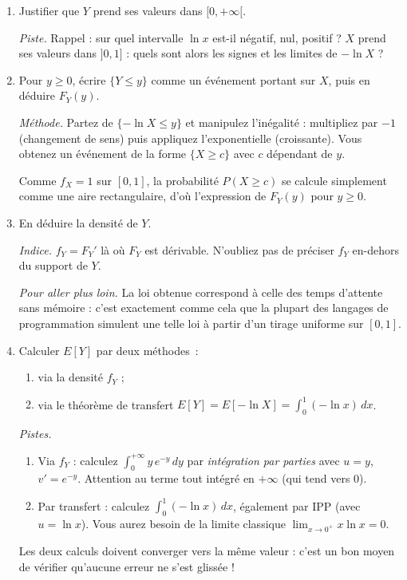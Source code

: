 \begin{enumerate}
  \item Justifier que $Y$ prend ses valeurs dans $[0,+\infty[$.
  \begin{solution}
    \textit{Piste.} Rappel : sur quel intervalle $\ln x$ est-il
    négatif, nul, positif ? $X$ prend ses valeurs dans $]0,1]$ :
    quels sont alors les signes et les limites de $-\ln X$ ?
  \end{solution}

  \item Pour $y\ge 0$, écrire $\{Y\le y\}$ comme un événement portant
  sur $X$, puis en déduire $F_Y(y)$.
  \begin{solution}
    \textit{Méthode.} Partez de $\{-\ln X\le y\}$ et manipulez
    l'inégalité : multipliez par $-1$ (changement de sens) puis
    appliquez l'exponentielle (croissante). Vous obtenez un
    événement de la forme $\{X\ge c\}$ avec $c$ dépendant de $y$.

    Comme $f_X=1$ sur $[0,1]$, la probabilité $P(X\ge c)$ se
    calcule simplement comme une aire rectangulaire, d'où
    l'expression de $F_Y(y)$ pour $y\ge 0$.
  \end{solution}

  \item En déduire la densité de $Y$.
  \begin{solution}
    \textit{Indice.} $f_Y=F_Y'$ là où $F_Y$ est dérivable.
    N'oubliez pas de préciser $f_Y$ en-dehors du support de $Y$.

    \textit{Pour aller plus loin.} La loi obtenue correspond à celle
    des \og temps d'attente sans mémoire \fg{} : c'est exactement
    comme cela que la plupart des langages de programmation
    simulent une telle loi à partir d'un tirage uniforme sur $[0,1]$.
  \end{solution}

  \item Calculer $E[Y]$ par deux méthodes~:
  \begin{enumerate}
    \item via la densité $f_Y$ ;
    \item via le théorème de transfert
    $E[Y]=E[-\ln X]=\int_0^1(-\ln x)\,dx$.
  \end{enumerate}
  \begin{solution}
    \textit{Pistes.}
    \begin{enumerate}
    \item Via $f_Y$ : calculez $\int_0^{+\infty}y\,e^{-y}\,dy$
    par \emph{intégration par parties} avec $u=y$, $v'=e^{-y}$.
    Attention au terme tout intégré en $+\infty$ (qui tend vers $0$).
    \item Par transfert : calculez $\int_0^1(-\ln x)\,dx$,
    également par IPP (avec $u=\ln x$). Vous aurez besoin de la
    limite classique $\lim_{x\to 0^+}x\ln x=0$.
    \end{enumerate}
    Les deux calculs doivent converger vers la même valeur : c'est
    un bon moyen de vérifier qu'aucune erreur ne s'est glissée !
  \end{solution}
\end{enumerate}
\newpage 

